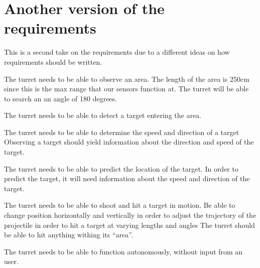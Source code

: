 \section{Another version of the requirements}
This is a second take on the requirements due to a different ideas on how
requirements should be written.\nl

The turret needs to be able to observe an area. The length of the area is 250cm
since this is the max range that our sensors function at. The turret will be
able to search an an angle of 180 degrees.\nl

The turret needs to be able to detect a target entering the area.\nl

The turret needs to be able to determine the speed and direction of a target
Observing a target should yield information about the direction and speed of
the target.\nl

The turret needs to be able to predict the location of the target. In order to
predict the target, it will need information about the speed and direction of
the target.\nl

The turret needs to be able to shoot and hit a target in motion. Be able to
change position horizontally and vertically in order to adjust the trajectory
of the projectile in order to hit a target at varying lengths and angles The
turret should be able to hit anything withing its ``area''.\nl

The turret needs to be able to function autonomously, without input from an
user.\nl